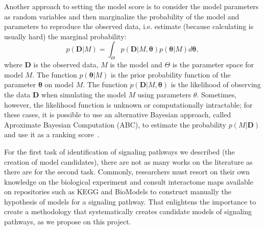 Another approach to setting the model score is to consider the model 
parameters as random variables and then marginalize the probability of 
the model and parameters to reproduce the observed data, i.e. estimate 
(because calculating is usually hard) the marginal probability:
\begin{equation}
    p ({\bm D} | M) = \int_{\Theta} p ({\bm D} | M, {\bm \theta}) 
        p({\bm \theta} | M) d{\bm \theta},
    \label{eq:marginal_likelihood_integral}
\end{equation}
where ${\bm D}$ is the observed data, $M$ is the model and $\Theta$ is 
the parameter space for model $M$. The function $p({\bm \theta} | M)$ is 
the prior probability function of the parameter ${\bm \theta}$ on model 
$M$. The function $p ({\bm D} | M, {\bm \theta})$ is the likelihood of 
observing the data ${\bm D}$ when simulating the model $M$ using 
parameters $\theta$. Sometimes, however, the likelihood function is 
unknown or computationally intractable; for these cases, it is possible 
to use an alternative Bayesian approach, called Aproximate Bayesian 
Computation (ABC), to estimate the probability $p (M | {\bm D})$ and use 
it as a ranking score~\cite{Toni2009}.

For the first task of identification of signaling pathways we described
(the creation of model candidates), there are not as many works on the 
literature as there are for the second task. Commonly, researchers must 
resort on their own knowledge on the biological experiment and consult 
interactome maps available on repositories such as KEGG and BioModels to
construct manually the hypothesis of models for a signaling pathway. 
That enlightens the importance to create a methodology that 
systematically creates candidate models of signaling pathways, as we 
propose on this project.



